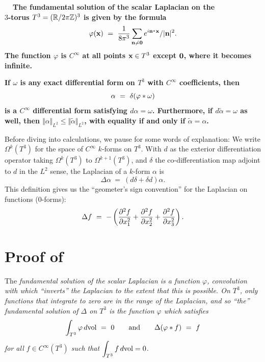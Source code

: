 \begin{proposition}\label{prop:fs}
\textbf{\boldmath  \ \ The fundamental solution of the scalar Laplacian on the\\
 $3$-torus $T^3 = (\mathbb R/2\pi\mathbb Z)^3$ is given by the formula
$$
\varphi(\x) \ = \
{1\over 8\pi^3}\sum_{\n\ne\zero}
e^{i\n\dte\x} / \|\n\|^2.
$$
The function $\varphi$ is $C^\infty$ at all points $
\textup{\bf x}\in T^3$ except ${\bf0}$, where it becomes infinite.} 
\end{proposition}

\bigskip

\begin{proposition}\label{prop:alp}
\textbf{\boldmath  If $\omega$ is any exact differential form on $T^3$ with $C^\infty$ coefficients, then 
$$
\alpha \ = \ \delta(\varphi * \omega)
$$
is a $C^\infty$ differential form satisfying $d\alpha=\omega$.  Furthermore, if $d\widetilde\alpha=\omega$ as well, then $\Vert\alpha\Vert_{L^2}\le\Vert\widetilde\alpha\Vert_{L^2}$, with equality if and only if $\widetilde\alpha=\alpha$.} 
\end{proposition} 


Before diving into calculations, we pause for some words of explanation: We write $\Omega^k(T^3)$ for the space of $C^\infty$ $k$-forms on $T^3$. With $d$ as the exterior differentiation operator taking $\Omega^k(T^3)$ to $\Omega^{k+1}(T^3)$, and $\delta$ the co-differentiation map adjoint to  $d$ in the $L^2$ sense, the Laplacian of a $k$-form $\alpha$ is 
$$
\Delta\alpha \ = \ (d\delta+\delta d)\alpha.
$$
This definition gives us the ``geometer's sign convention'' for the Laplacian on functions (0-forms):
$$
\Delta f \ = \  -\left({\partial^2 f\over\partial x_1^2}+{\partial^2 f\over\partial x_2^2} +
{\partial^2 f\over\partial x_3^2}\right).
$$


\part{Proof of }

The \it fundamental solution \rm of the scalar Laplacian is a function $\varphi$, 
convolution with which ``inverts'' the Laplacian to the extent that this is possible. On $T^3$, only 
functions that integrate to zero are in the range of the Laplacian, and so ``the'' fundamental 
solution of $\Delta$ on $T^3$ is the function $\varphi$ which satisfies
$$
\int_{T^3}\varphi\,d\!\mathop{\rm vol}\nolimits \ = \  0
\qquad\textup{and}\qquad 
\Delta(\varphi * f) \ = \ f
$$
for all $f\in C^\infty(T^3)$ such that $\displaystyle{\int_{T^3}f\,d\!\mathop{\rm vol}\nolimits=0}$.

